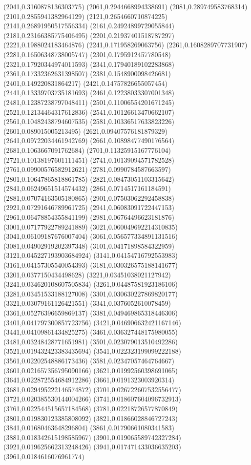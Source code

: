 {(2041,0.3160878136303775)
(2061,0.2944668994338691)
(2081,0.289749583768314)
(2101,0.2855941382964129)
(2121,0.2654660710874225)
(2141,0.26891950517556334)
(2161,0.24924899729055844)
(2181,0.23166385775406495)
(2201,0.21937401518787297)
(2221,0.1988024183464876)
(2241,0.171958269063756)
(2261,0.1608289707731907)
(2281,0.16506348738005747)
(2301,0.1795912457780548)
(2321,0.17920344974011593)
(2341,0.17940189102283868)
(2361,0.17332362631398507)
(2381,0.1548900098426681)
(2401,0.149220831864217)
(2421,0.14757826655057454)
(2441,0.13339703735181693)
(2461,0.12238033307001348)
(2481,0.12387238797048411)
(2501,0.11006554201671245)
(2521,0.12134464317612836)
(2541,0.10126613470662107)
(2561,0.10482438794607535)
(2581,0.10336517633823226)
(2601,0.089015005213495)
(2621,0.09407576181879329)
(2641,0.09722034461942769)
(2661,0.10898477490176564)
(2681,0.1063667091762684)
(2701,0.11325915167776104)
(2721,0.10138197601111451)
(2741,0.10139094571782528)
(2761,0.09900576582912621)
(2781,0.0990784587663597)
(2801,0.10647865818861785)
(2821,0.08473051103315642)
(2841,0.06249651514574432)
(2861,0.0714517161184591)
(2881,0.07074163505180865)
(2901,0.07503062292458838)
(2921,0.07291646789961725)
(2941,0.06083091722447153)
(2961,0.06478854355841199)
(2981,0.06764496623181876)
(3001,0.07177922789241889)
(3021,0.060049692214310835)
(3041,0.06109187676007404)
(3061,0.056577334891131516)
(3081,0.04902919202397348)
(3101,0.04171898584322959)
(3121,0.045227193903684924)
(3141,0.04154716792553983)
(3161,0.04157305540054393)
(3181,0.030326575188141677)
(3201,0.0377150434498628)
(3221,0.03451038021127942)
(3241,0.034620108607505834)
(3261,0.04487581923186106)
(3281,0.03451533188127008)
(3301,0.030630227869820177)
(3321,0.03079161126421551)
(3341,0.0376052610078459)
(3361,0.05276396659869137)
(3381,0.049469865318446306)
(3401,0.041797300857723756)
(3421,0.046906632421167146)
(3441,0.04109861434825275)
(3461,0.036327448175980055)
(3481,0.03248428771651981)
(3501,0.023079013510492286)
(3521,0.019432423383435694)
(3541,0.022323199099222188)
(3561,0.02202548886173436)
(3581,0.02347057464764667)
(3601,0.021657356795090166)
(3621,0.01992560398691065)
(3641,0.022872554684912286)
(3661,0.0191323003920314)
(3681,0.029495222146574872)
(3701,0.026722607532556477)
(3721,0.020385530144004266)
(3741,0.018607604096732913)
(3761,0.022544515657184568)
(3781,0.02218726577870849)
(3801,0.019830123385808092)
(3821,0.01866028846727243)
(3841,0.01680463648296804)
(3861,0.01790661080341583)
(3881,0.018342615198585967)
(3901,0.019065589742327284)
(3921,0.019625662313248426)
(3941,0.017471433036635203)
(3961,0.0184616076961774)
}
